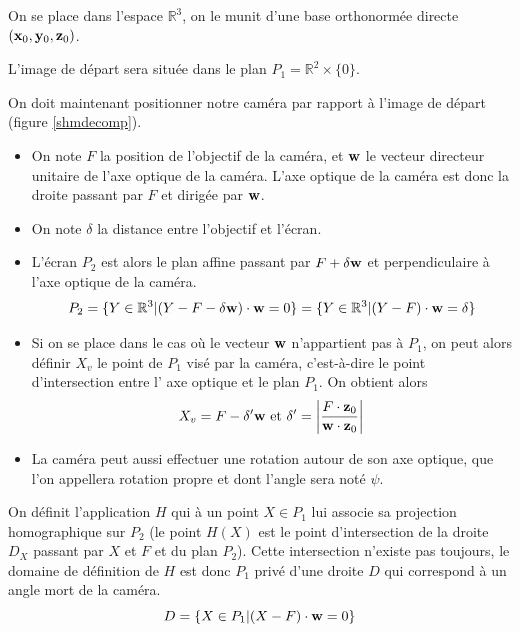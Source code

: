 \begin{defnot}
On se place dans l'espace $\mathbb{R}^{3}$, on le munit d'une base orthonormée directe $(\mathbf{x}_0,\mathbf{y}_0,\mathbf{z}_0)$.

L'image de départ sera située dans le plan $P_{1}= \mathbb{R}^{2}\times \{0\}$.

On doit maintenant positionner notre caméra par rapport à l'image de départ (figure \ref{shmdecomp}).

\begin{itemize}
\item On note $F$ la position de l'objectif de la caméra, et $\mathbf{w}$ le vecteur directeur unitaire de l'axe optique de la caméra. L'axe optique de la caméra est donc la droite passant par $F$ et dirigée par $\mathbf{w}$.

\item On note $\delta$ la distance entre l'objectif et l'écran.

\item L'écran $P_{2}$ est alors le plan affine passant par $F+\delta \mathbf{w}$ et perpendiculaire à l'axe optique de la caméra.
\begin{equation*}
P_{2}=\{Y\in \mathbb{R}^{3}|(Y-F-\delta \mathbf{w})\cdot \mathbf{w}=0\}=\{Y\in \mathbb{R}^{3}|(Y-F)\cdot \mathbf{w}=\delta\}
\end{equation*}

\item Si on se place dans le cas où le vecteur $\mathbf{w}$ n'appartient pas à $P_{1}$, on peut alors définir $X_{v}$ le point de $P_{1}$ visé par la caméra, c'est-à-dire le point d'intersection entre l' axe optique et le plan $P_{1}$. On obtient alors
\begin{equation*}
X_{v}=F-\delta'\mathbf{w} \text{ et }\delta'=\small{\left|\frac{F \cdot \mathbf{z}_{0}}{\mathbf{w}\cdot \mathbf{z}_{0}} \right|}
\end{equation*}

\item La caméra peut aussi effectuer une rotation autour de son axe optique, que l'on appellera rotation propre et dont l'angle sera noté $\psi$.
\end{itemize}

On définit l'application $H$ qui à un point $X\in P_{1}$ lui associe sa projection homographique sur $P_{2}$ (le point $H(X)$ est le point d'intersection de la droite $D_{X}$ passant par $X$ et $F$ et du plan $P_{2}$). Cette intersection n'existe pas toujours, le domaine de définition de $H$ est donc $P_1$ privé d'une droite $D$ qui correspond à un angle mort de la caméra.
\begin{equation*}
D=\{X\in P_1 | (X-F) \cdot \mathbf{w} =0\}
\end{equation*}


\end{defnot}
